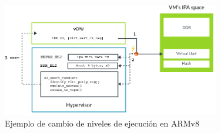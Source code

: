 \begin{itemize}
	\begin{figure}[!h]
		\centering
		\includegraphics[width=0.85\textwidth]{recursos/armv8_virt_example.png}
		\caption{Ejemplo de cambio de niveles de ejecución en ARMv8}
		\label{fig:armv8_virt_example}
	\end{figure}

\end{itemize}
